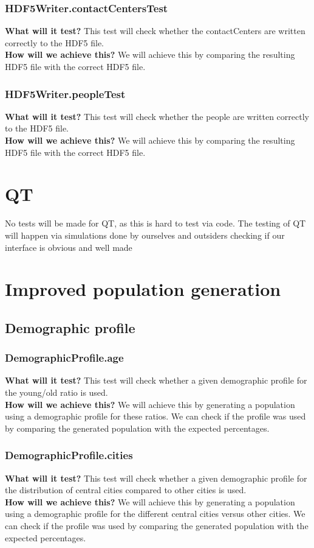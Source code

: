\documentclass{article}
\begin{document}
\subsubsection{HDF5Writer.contactCentersTest}
\textbf{What will it test?}
This test will check whether the contactCenters are written correctly to the HDF5 file. \\
\newline
\textbf{How will we achieve this?}
We will achieve this by comparing the resulting HDF5 file with the correct HDF5 file.

\subsubsection{HDF5Writer.peopleTest}
\textbf{What will it test?}
This test will check whether the people are written correctly to the HDF5 file. \\
\newline
\textbf{How will we achieve this?}
We will achieve this by comparing the resulting HDF5 file with the correct HDF5 file.
\section{QT}
No tests will be made for QT, as this is hard to test via code. The testing of QT will happen via simulations done by ourselves and outsiders checking if our interface is obvious and well made
\section{Improved population generation}
\subsection{Demographic profile}
\subsubsection{DemographicProfile.age} 
\textbf{What will it test?} 
This test will check whether a given demographic profile for the young/old ratio is used. \\
\newline
\textbf{How will we achieve this?} 
We will achieve this by generating a population using a demographic profile for these ratios. We can check if the profile was used by comparing the generated population with the expected percentages.

\subsubsection{DemographicProfile.cities}
\textbf{What will it test?} 
This test will check whether a given demographic profile for the distribution of central cities compared to other cities is used. \\
\newline
\textbf{How will we achieve this?}
We will achieve this by generating a population using a demographic profile for the different central cities versus other cities. We can check if the profile was used by comparing the generated population with the expected percentages.
\end{document}
